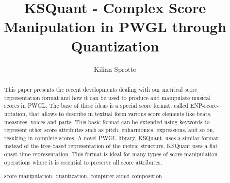 \documentclass[runningheads,a4paper]{llncs}
\newcommand{\keywords}[1]{\par\addvspace\baselineskip
  \noindent\keywordname\enspace\ignorespaces#1}
\begin{document}
\mainmatter  %

\title{KSQuant - Complex Score Manipulation in PWGL through Quantization}


%
%
\author{Kilian Sprotte}

%


%
%

\maketitle

\begin{abstract}
  This paper presents the recent developments dealing with our
  metrical score representation format and how it can be used to
  produce and manipulate musical scores in PWGL. The base of these
  ideas is a special score format, called ENP-score-notation, that
  allows to describe in textual form various score elements like
  beats, measures, voices and parts. This basic format can be extended
  using keywords to represent other score attributes such as pitch,
  enharmonics, expressions, and so on, resulting in complete scores. A
  novel PWGL library, KSQuant, uses a similar format: instead of the
  tree-based representation of the metric structure, KSQuant uses a
  flat onset-time representation.  This format is ideal for many types
  of score manipulation operations where it is essential to preserve
  all score attributes.
  \keywords{score manipulation, quantization, computer-aided composition}
\end{abstract}
\end{document}
